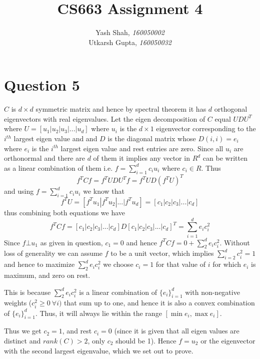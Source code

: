 \documentclass{article}
\title{CS663 Assignment 4}
\author{Yash Shah, \textit{160050002}\\Utkarsh Gupta, \textit{160050032}}
\begin{document}
\maketitle


\section*{Question 5}
${C}$ is $d \times d$ symmetric matrix and hence by spectral theorem it has $d$ orthogonal eigenvectors with real eigenvalues. 
Let the eigen decomposition of ${C}$
equal ${U}{D}{U}^{T} $ 
where ${U} = [{u_1}|{u_2}|{u_3}|...|{u_d}]$ 
where ${u_i}$ is the $d \times 1$ eigenvector corresponding to the $i^{th}$ largest eigen value and and ${D}$ is the diagonal matrix whose $D(i,i) = e_i$ where $e_i$ is the $i^{th}$ largest eigen value and rest entries are zero. Since all ${u_i}$ are orthonormal and there are $d$ of them it implies any vector in $R^{d}$ can be written as a linear combination of them i.e. ${f} = \sum_{i=1}^{d} c_i {u_i}$ where $c_i \in R$. Thus
$$ {f}^{T}{Cf} = {f}^{T}{UDU}^{T}{f} = {f}^{T}{UD}(f^{T}{U})^{T} $$
and using ${f} = \sum_{i=1}^{d} c_i {u_i}$ we know that 
$${f}^{T}{U} = [{f}^{T}{u}_1|{f}^{T}{u}_2|...|{f}^{T}{u}_d] = [c_1|c_2|c_3|...|c_d]$$
thus combining both equations we have
$$ {f}^{T}{Cf} = [c_1|c_2|c_3|...|c_d] {D} [c_1|c_2|c_3|...|c_d]^{T} = \sum_{i=1}^{d} e_i c_i^{2} $$
Since $f \bot u_1$ as given in question, $c_1 = 0 $ and hence $ {f}^{T}{Cf} = 0 + \sum_{2}^{d} e_i c_i^2$. Without loss of generality we can assume ${f}$ to be a unit vector, which implies $\sum_{i=2}^{d} c_i^2 = 1$ and hence to maximize $\sum_{2}^{d} e_i c_i^2$  we choose $c_i = 1$ for that value of $i$ for which $e_i$ is maximum, and zero on rest.

This is because $\sum_{2}^{d} e_i c_i^2$ is a linear combination of $\{e_i\}_{i=1}^d$ with non-negative weights ($c_i^2\geq0\ \forall i)$ that sum up to one, and hence it is also a convex combination of $\{e_i\}_{i=1}^d$. Thus, it will always lie within the range $[\min e_i, \max e_i]$.

 Thus we get $c_2 = 1$, and rest $c_i = 0$ (since it is given that all eigen values are distinct and $rank(C) > 2$, only $c_2$ should be 1). Hence ${f} = u_2$ or the eigenvector with the second largest eigenvalue, which we set out to prove. 
\end{document}
